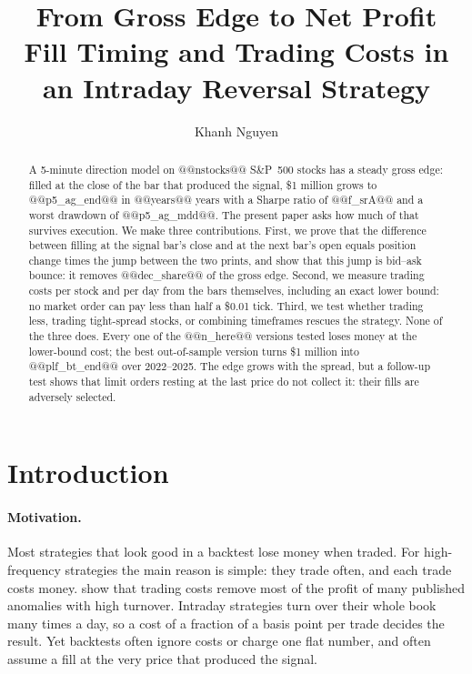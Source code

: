 \documentclass[11pt,a4paper]{article}
\title{\textbf{From Gross Edge to Net Profit}\\[0.4em]
\large Fill Timing and Trading Costs in an Intraday Reversal Strategy}
\author{Khanh Nguyen}
\date{}
\begin{document}
\maketitle

\begin{abstract}
\noindent A 5-minute direction model on @@nstocks@@ S\&P~500 stocks has a steady gross edge: filled at the
close of the bar that produced the signal, \$1 million grows to @@p5_ag_end@@ in @@years@@ years with a
Sharpe ratio of @@f_srA@@ and a worst drawdown of @@p5_ag_mdd@@. The present paper asks how much of that survives
execution. We make three contributions. First, we prove that the difference between filling at the
signal bar's close and at the next bar's open equals position change times the jump between the two
prints, and show that this jump is bid--ask bounce: it removes @@dec_share@@ of the gross edge. Second, we
measure trading costs per stock and per day from the bars themselves, including an exact lower bound: no
market order can pay less than half a \$0.01 tick. Third, we test whether trading less, trading
tight-spread stocks, or combining timeframes rescues the strategy. None of the three does. Every one of the
@@n_here@@ versions tested loses money at the lower-bound cost; the best out-of-sample version turns \$1
million into @@plf_bt_end@@ over 2022--2025. The edge grows with the spread, but a follow-up test shows that
limit orders resting at the last price do not collect it: their fills are adversely selected.
\end{abstract}

\section{Introduction}
\label{sec:intro}

\paragraph{Motivation.} Most strategies that look good in a backtest lose money when traded. For
high-frequency strategies the main reason is simple: they trade often, and each trade costs money.
\citet{novymarx2016} show that trading costs remove most of the profit of many published anomalies with
high turnover. Intraday strategies turn over their whole book many times a day, so a cost of a fraction
of a basis point per trade decides the result. Yet backtests often ignore costs or charge one flat
number, and often assume a fill at the very price that produced the signal.
\end{document}

